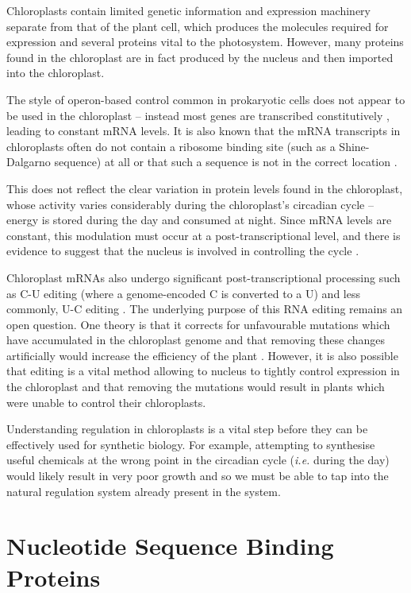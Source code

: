 Chloroplasts contain limited genetic information and expression machinery 
separate from that of the plant cell, which produces the molecules required 
for expression and several proteins vital to the photosystem.
However, many proteins found in the chloroplast are in fact produced by the
nucleus and then imported into the chloroplast.

The style of operon-based control common in prokaryotic cells does not appear 
to be used in the chloroplast -- instead most genes are 
transcribed constitutively \citep{Sugita1996}, leading to constant mRNA levels.
It is also known that the mRNA transcripts in chloroplasts often do not 
contain a ribosome binding site (such as a Shine-Dalgarno sequence) at all or 
that such a sequence is not in the correct 
location \citep{Sugiura1998,Zerges2000}.

This does not reflect the clear variation in protein levels found in the 
chloroplast, whose activity varies considerably during the chloroplast's 
circadian cycle -- energy is stored during the day and consumed at night.
Since mRNA levels are constant, this modulation must occur at a 
post-transcriptional level, and there is evidence to suggest that the nucleus
is involved in controlling the cycle \citep{Matsuo2006}.

Chloroplast mRNAs also undergo significant post-transcriptional processing such
as C-U editing (where a genome-encoded C is converted to a U) and less 
commonly, U-C editing \citep{Castandet2011}.
The underlying purpose of this RNA editing remains an open question. 
One theory is that it corrects for unfavourable mutations which have
accumulated in the chloroplast genome and that removing these changes 
artificially would increase the efficiency of the plant \citep{Fujii2011}.
However, it is also possible that editing is a vital method allowing to nucleus
to tightly control expression in the chloroplast and that removing the 
mutations would result in plants which were unable to control their 
chloroplasts.

Understanding regulation in chloroplasts is a vital step before they can be
effectively used for synthetic biology.
For example, attempting to synthesise useful chemicals at the wrong point in 
the circadian cycle (\emph{i.e.} during the day) would likely result in very 
poor growth and so we must be
able to tap into the natural regulation system already present in the system.

\section{Nucleotide Sequence Binding Proteins}
\label{sec:intro_binding}

